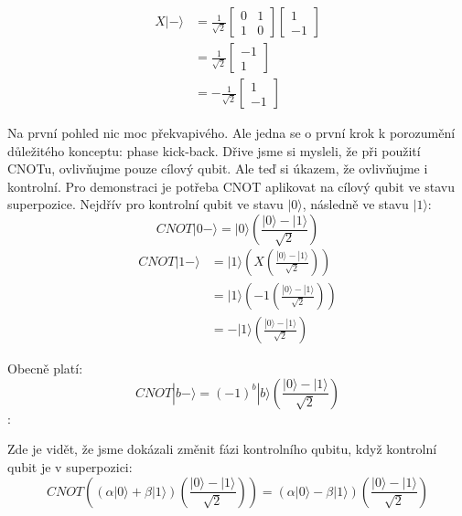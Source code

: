 \documentclass[11pt]{article}
\begin{document}
\begin{equation*}
    \begin{split}
        X|-\rangle & = \frac{1}{\sqrt{2}}\begin{bmatrix}
            0 & 1 \\
            1 & 0
        \end{bmatrix} \begin{bmatrix}
            1 \\
            -1
        \end{bmatrix} \\
        & = \frac{1}{\sqrt{2}} \begin{bmatrix}
            -1 \\
            1
        \end{bmatrix}\\
        & =  -\frac{1}{\sqrt{2}} \begin{bmatrix}
            1 \\
            -1
        \end{bmatrix}
    \end{split}
\end{equation*}
\par Na první pohled nic moc překvapivého.
Ale jedna se o první krok k porozumění důležitého konceptu: phase kick-back.
Dřive jsme si mysleli, že při použití CNOTu, ovlivňujme pouze cílový qubit.
Ale teď si úkazem, že ovlivňujme i kontrolní.
Pro demonstraci je potřeba CNOT aplikovat na cílový qubit ve stavu superpozice.
Nejdřív pro kontrolní qubit ve stavu $|0\rangle$, následně ve stavu $|1\rangle$:
$$CNOT |0-\rangle = |0\rangle \left(\frac{|0\rangle - |1\rangle}{\sqrt{2}}\right)$$
\begin{equation*}
    \begin{split}
        CNOT |1-\rangle & = |1\rangle \left(X \left(\frac{|0\rangle - |1\rangle}{\sqrt{2}}\right)\right) \\
        & = |1\rangle \left(-1\left(\frac{|0\rangle - |1\rangle}{\sqrt{2}}\right)\right) \\
        & = -|1\rangle \left(\frac{|0\rangle - |1\rangle}{\sqrt{2}}\right)
    \end{split}
\end{equation*}
\par Obecně platí:
$$CNOT |b-\rangle = (-1)^b|b\rangle\left(\frac{|0\rangle - |1\rangle}{\sqrt{2}}\right)$$:
\par Zde je vidět, že jsme dokázali změnit fázi kontrolního qubitu, když kontrolní qubit je v superpozici:
$$CNOT\left((\alpha|0\rangle + \beta|1\rangle)\left(\frac{|0\rangle - |1\rangle}{\sqrt{2}}\right)\right) = (\alpha|0\rangle - \beta|1\rangle)\left(\frac{|0\rangle - |1\rangle}{\sqrt{2}}\right)$$
\end{document}
